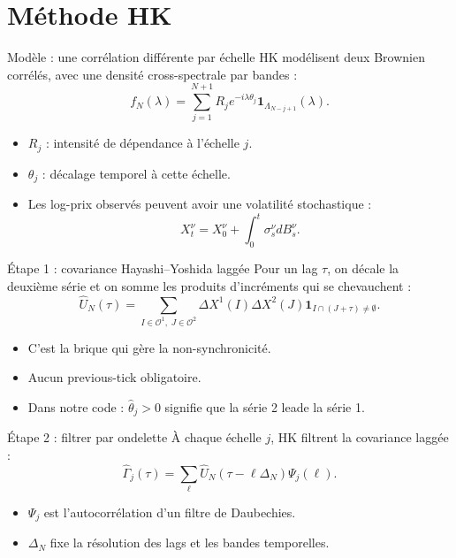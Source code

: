 \documentclass[10pt,aspectratio=169]{beamer}
\newcommand{\thetahat}{\hat{\theta}}
\newcommand{\Uhat}{\hat{U}}
\newcommand{\Gammahat}{\hat{\Gamma}}
\newcommand{\Psij}{\Psi_j}
\begin{document}
\section{Méthode HK}

\begin{frame}{Modèle : une corrélation différente par échelle}
  \small
  HK modélisent deux Brownien corrélés, avec une densité cross-spectrale par bandes :
  \[
    f_N(\lambda)
    =
    \sum_{j=1}^{N+1}
    R_j e^{-i\lambda\theta_j}
    \mathbf{1}_{\Lambda_{N-j+1}}(\lambda).
  \]

  \vspace{0.2cm}
  \begin{itemize}
    \item \(R_j\) : intensité de dépendance à l'échelle \(j\).
    \item \(\theta_j\) : décalage temporel à cette échelle.
    \item Les log-prix observés peuvent avoir une volatilité stochastique :
    \[
      X_t^\nu = X_0^\nu + \int_0^t \sigma_s^\nu dB_s^\nu .
    \]
  \end{itemize}
\end{frame}

\begin{frame}{Étape 1 : covariance Hayashi--Yoshida laggée}
  Pour un lag \(\tau\), on décale la deuxième série et on somme les produits d'incréments qui se chevauchent :
  \[
    \Uhat_N(\tau)
    =
    \sum_{I \in \mathcal{O}^1,\; J \in \mathcal{O}^2}
    \Delta X^1(I)\Delta X^2(J)
    \mathbf{1}_{I \cap (J+\tau) \neq \emptyset}.
  \]

  \vspace{0.25cm}
  \begin{itemize}
    \item C'est la brique qui gère la non-synchronicité.
    \item Aucun previous-tick obligatoire.
    \item Dans notre code : \(\thetahat_j>0\) signifie que la série 2 leade la série 1.
  \end{itemize}
\end{frame}

\begin{frame}{Étape 2 : filtrer par ondelette}
  À chaque échelle \(j\), HK filtrent la covariance laggée :
  \[
    \Gammahat_j(\tau)
    =
    \sum_{\ell}
    \Uhat_N(\tau-\ell\Delta_N)\Psij(\ell).
  \]

  \vspace{0.25cm}
  \begin{itemize}
    \item \(\Psij\) est l'autocorrélation d'un filtre de Daubechies.
    \item \(\Delta_N\) fixe la résolution des lags et les bandes temporelles.
  \end{itemize}
\end{frame}
\end{document}
